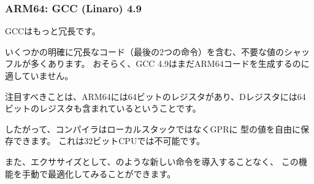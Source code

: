 \subsubsection{ARM64: \NonOptimizing GCC (Linaro) 4.9}



\NonOptimizing GCCはもっと冗長です。

いくつかの明確に冗長なコード（最後の2つの命令）を含む、不要な値のシャッフルが多くあります。 
おそらく、GCC 4.9はまだARM64コードを生成するのに適していません。

注目すべきことは、ARM64には64ビットのレジスタがあり、Dレジスタには64ビットのレジスタも含まれているということです。

したがって、コンパイラはローカルスタックではなく\ac{GPR}に \Tdouble 型の値を自由に保存できます。 
これは32ビットCPUでは不可能です。

また、エクササイズとして、のような新しい命令を導入することなく、
この機能を手動で最適化してみることができます。
